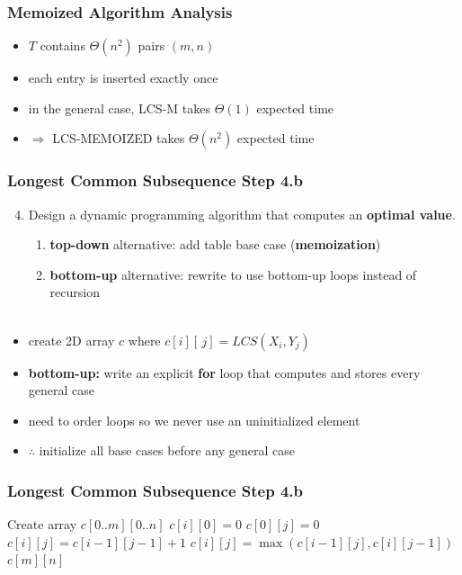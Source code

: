 \documentclass{beamer}
\newcommand{\stanza}{ \\~\ }
\begin{document}
\begin{frame} \frametitle{Memoized Algorithm Analysis}
  \begin{itemize}
    \item $T$ contains $\Theta(n^2)$ pairs $(m, n)$
    \item each entry is inserted exactly once
    \item in the general case, LCS-M takes $\Theta(1)$ expected time
    \item $\Rightarrow$ LCS-MEMOIZED takes $\Theta(n^2)$ expected time
  \end{itemize}
\end{frame}

\begin{frame} \frametitle{Longest Common Subsequence Step 4.b}
  \begin{enumerate}
    \setcounter{enumi}{3}
    \item Design a dynamic programming algorithm that computes an \textbf{optimal value}.
    \begin{enumerate}
      \item \textbf{top-down} alternative: add table base case (\textbf{memoization})
      \item \textbf{bottom-up} alternative: rewrite to use bottom-up loops instead of recursion
      \stanza
    \end{enumerate}
\end{enumerate}

\begin{itemize}
  \item create 2D array $c$ where $c[i][\, j] = LCS(X_i, Y_j)$
  \item \textbf{bottom-up:} write an explicit \textbf{for} loop that computes and stores every general case
  \item need to order loops so we never use an uninitialized element
  \item $\therefore$ initialize all base cases before any general case
\end{itemize}
\end{frame}
  
\begin{frame} \frametitle{Longest Common Subsequence Step 4.b}
  {\footnotesize
  \begin{algorithmic}[1]
    \State Create array $c[0..m][0..n]$ 
      \State $c[i][0] = 0$
    \EndFor
     
      \State $c[0][j] = 0$
    \EndFor
          \State $c[i][j] = c[i-1][j-1] + 1$
        \Else
          \State $c[i][j] = \max(c[i-1][j], c[i][j-1])$
        \EndIf
      \EndFor
    \EndFor
    \State \Return $c[m][n]$
    \EndFunction
  \end{algorithmic}
  }
\end{frame}
\end{document}
